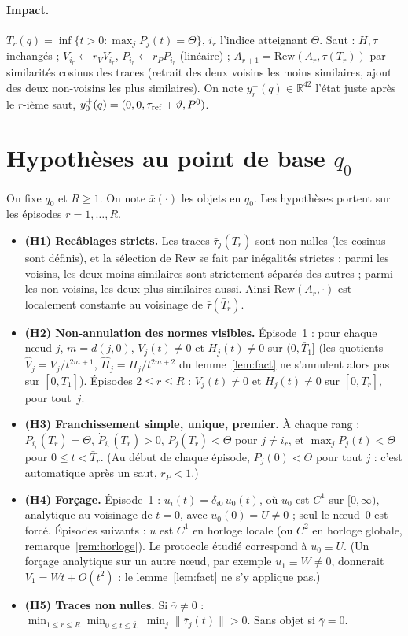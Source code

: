 \documentclass[11pt,a4paper]{article}
\theoremstyle{remark}
\newcommand{\R}{\mathbb R}
\newcommand{\norm}[1]{\lVert #1\rVert}
\newcommand{\vth}{\vartheta}
\begin{document}
\paragraph{Impact.} $T_r(q)=\inf\{t>0:\max_jP_j(t)=\Theta\}$, $i_r$ l'indice atteignant $\Theta$. Saut : $H,\tau$ inchang\'es ; $V_{i_r}\leftarrow r_VV_{i_r}$, $P_{i_r}\leftarrow r_PP_{i_r}$ (lin\'eaire) ; $A_{r+1}=\mathrm{Rew}(A_r,\tau(T_r))$ par similarit\'es cosinus des traces (retrait des deux voisins les moins similaires, ajout des deux non-voisins les plus similaires). On note $y_r^+(q)\in\R^{42}$ l'\'etat juste apr\`es le $r$-i\`eme saut, $y_0^+(q)=(0,0,\tau_{\rm ref}+\vth,P^0)$.

\section{Hypoth\`eses au point de base $q_0$}
On fixe $q_0$ et $R\ge1$. On note $\bar x(\cdot)$ les objets en $q_0$. Les hypoth\`eses portent sur les \'episodes $r=1,\dots,R$.
\begin{itemize}[leftmargin=1.6em,itemsep=2pt]
\item \textbf{(H1) Recâblages stricts.} Les traces $\bar\tau_j(\bar T_r)$ sont non nulles (les cosinus sont d\'efinis), et la s\'election de $\mathrm{Rew}$ se fait par in\'egalit\'es strictes : parmi les voisins, les deux moins similaires sont strictement s\'epar\'es des autres ; parmi les non-voisins, les deux plus similaires aussi. Ainsi $\mathrm{Rew}(A_r,\cdot)$ est localement constante au voisinage de $\bar\tau(\bar T_r)$.
\item \textbf{(H2) Non-annulation des normes visibles.} \'Episode~1 : pour chaque n\oe ud $j$, $m=d(j,0)$, $V_j(t)\neq0$ et $H_j(t)\ne0$ sur $(0,\bar T_1]$ (les quotients $\hat V_j=V_j/t^{2m+1}$, $\hat H_j=H_j/t^{2m+2}$ du lemme~\ref{lem:fact} ne s'annulent alors pas sur $[0,\bar T_1]$). \'Episodes $2\le r\le R$ : $V_j(t)\neq0$ et $H_j(t)\neq0$ sur $[0,\bar T_r]$, pour tout~$j$.
\item \textbf{(H3) Franchissement simple, unique, premier.} \`A chaque rang : $P_{i_r}(\bar T_r)=\Theta$, $\dot P_{i_r}(\bar T_r)>0$, $P_j(\bar T_r)<\Theta$ pour $j\neq i_r$, et $\max_jP_j(t)<\Theta$ pour $0\le t<\bar T_r$. (Au d\'ebut de chaque \'episode, $P_j(0)<\Theta$ pour tout $j$ : c'est automatique apr\`es un saut, $r_P<1$.)
\item \textbf{(H4) For\c{c}age.} \'Episode~1 : $u_i(t)=\delta_{i0}\,u_0(t)$, o\`u $u_0$ est $C^1$ sur $[0,\infty)$, analytique au voisinage de $t=0$, avec $u_0(0)=U\neq0$ ; seul le n\oe ud~0 est forc\'e. \'Episodes suivants : $u$ est $C^1$ en horloge locale (ou $C^2$ en horloge globale, remarque~\ref{rem:horloge}). Le protocole \'etudi\'e correspond \`a $u_0\equiv U$. (Un for\c{c}age analytique sur un autre n\oe ud, par exemple $u_1\equiv W\neq0$, donnerait $V_1=Wt+O(t^2)$ : le lemme~\ref{lem:fact} ne s'y applique pas.)
\item \textbf{(H5) Traces non nulles.} Si $\bar\gamma\ne0$ : $\min_{1\le r\le R}\min_{0\le t\le\bar T_r}\min_j\norm{\bar\tau_j(t)}>0$. Sans objet si $\bar\gamma=0$.
\end{itemize}
\end{document}

